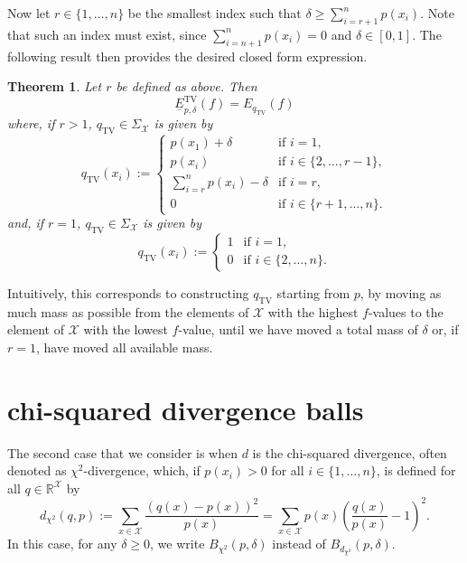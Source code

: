 \documentclass[10pt,a4paper]{amsart}
\newtheorem{theorem}{Theorem}
\begin{document}
Now let $r\in\{1,\ldots,n\}$ be the smallest index such that $\delta\geq\sum_{i=r+1}^{n} p(x_i)$. Note that such an index must exist, since $\sum_{i=n+1}^n p(x_i)=0$ and $\delta\in[0,1]$.
The following result then provides the desired closed form expression.


\begin{theorem}\label{thm:lowerexpectationtv}
Let $r$ be defined as above. Then
\begin{equation*}
    \underline{E}^\mathrm{TV}_{p,\delta}(f)
    =
    E_{q_\mathrm{TV}}(f)
\end{equation*}
where, if $r>1$, $q_\mathrm{TV}\in\Sigma_\mathcal{X}$ is given by
\begin{equation*}
    q_\mathrm{TV}(x_i):=
    \begin{cases}
        p(x_1)+\delta & \text{if } i=1,\\
        p(x_i) & \text{if } i\in\{2,\ldots,r-1\},\\
        \sum_{i=r}^{n} p(x_i)-\delta & \text{if } i=r,\\
        0 & \text{if } i\in\{r+1,\ldots,n\}.
    \end{cases}
\end{equation*}
and, if $r=1$, $q_\mathrm{TV}\in\Sigma_\mathcal{X}$ is given by
\begin{equation*}
    q_\mathrm{TV}(x_i):=
    \begin{cases}
        1 & \text{if } i=1,\\
        0 & \text{if } i\in\{2,\ldots,n\}.
    \end{cases}
\end{equation*}
\end{theorem}

Intuitively, this corresponds to constructing $q_\mathrm{TV}$ starting from $p$, by moving as much mass as possible from the elements of $\mathcal{X}$ with the highest $f$-values to the element of $\mathcal{X}$ with the lowest $f$-value, until we have moved a total mass of $\delta$ or, if $r=1$, have moved all available mass.

\section{chi-squared divergence balls}\label{sec:chi2}

The second case that we consider is when $d$ is the chi-squared divergence, often denoted as $\chi^2$-divergence, which, if $p(x_i)>0$ for all $i\in\{1,\ldots,n\}$, is defined for all $q\in\mathbb{R}^\mathcal{X}$ by
\begin{equation*}
    d_{\chi^2}(q,p):=\sum_{x\in\mathcal{X}}\frac{(q(x)-p(x))^2}{p(x)}
    =\sum_{x\in\mathcal{X}}p(x)\left(\frac{q(x)}{p(x)}-1\right)^2.
\end{equation*}
In this case, for any $\delta\geq0$, we write $B_{\chi^2}(p,\delta)$ instead of $B_{d_{\chi^2}}(p,\delta)$.
\end{document}
